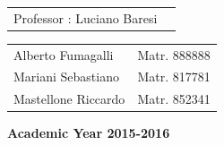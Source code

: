 \documentclass[15pt,a4paper,oneside]{article}
\begin{document}
\begin{center}
\begin{flushleft}
\begin{tabular}{l l }

\end{tabular}
\end{flushleft}
\vspace{5mm}

\begin{flushleft}
\begin{tabular}{l l }
Professor : Luciano Baresi\\
\end{tabular}
\end{flushleft}

\begin{flushright}
\begin{tabular}{l l }
Alberto Fumagalli & Matr. 888888\\
Mariani Sebastiano & Matr. 817781\\
Mastellone Riccardo & Matr. 852341\\
\end{tabular}
\end{flushright}

\vspace{43mm}
{\large{\bf Academic Year 2015-2016}}
\end{center}

\newpage
\tableofcontents
\listoffigures
\newpage





\newpage

\newpage

\newpage

\newpage

\newpage


%

%

%
\end{document}
